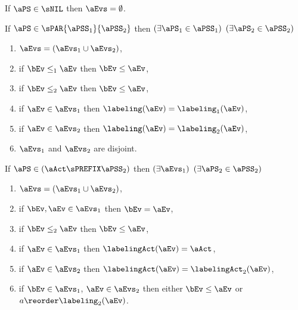 \begin{definition} %
  \label{def:pomset-semantics}

  \noindent
  If $\aPS\in\sNIL$ then $\aEvs = \emptyset$.

  \noindent
  If $\aPS \in \sPAR{\aPSS_1}{\aPSS_2}$ then  
  $(\exists\aPS_1\in\aPSS_1)$ $(\exists\aPS_2\in\aPSS_2)$
  \begin{enumerate}[topsep=0pt]
  \item \label{par-E}
    $\aEvs = (\aEvs_1\cup\aEvs_2)$,
  \item \label{par-le1}
    if $\bEv\le_1\aEv$ then $\bEv\le\aEv$, 
  \item \label{par-le2}
    if $\bEv\le_2\aEv$ then $\bEv\le\aEv$, 
  \item \label{par-lambda1}
    if $\aEv\in\aEvs_1$ then $\labeling(\aEv) = \labeling_1(\aEv)$, 
  \item \label{par-lambda2x}
    if $\aEv\in\aEvs_2$ then $\labeling(\aEv) = \labeling_2(\aEv)$,
    \label{pomsetParCountLast}
    \setcounter{pomsetParCount}{\value{enumi}}
  \item \label{par-disjoint}
    $\aEvs_1$ and $\aEvs_2$ are disjoint.
    \label{pomsetParDisjointCountLast}
    \setcounter{pomsetParDisjointCount}{\value{enumi}}
  \end{enumerate}
  \noindent
  If $\aPS \in (\aAct\sPREFIX\aPSS_2)$ then
  $(\exists\aEvs_1)$ $(\exists\aPS_2\in\aPSS_2)$
  \begin{enumerate}[topsep=0pt]
  \item \label{pre-E}
    $\aEvs=(\aEvs_1 \cup \aEvs_2)$,
  \item \label{pre-unique}
    if $\bEv,\aEv\in\aEvs_1$ then $\bEv=\aEv$,
  \item \label{pre-le2}
    if $\bEv\le_2\aEv$ then $\bEv\le\aEv$, 
  \item \label{pre-lambda1}
    if $\aEv\in\aEvs_1$ then $\labelingAct(\aEv) = \aAct$,
  \item \label{pre-lambda2}
    if $\aEv\in\aEvs_2$ then $\labelingAct(\aEv) = \labelingAct_2(\aEv)$,
  \item
    \label{pre-reorder}
    if $\bEv\in\aEvs_1$, $\aEv\in\aEvs_2$ then either
    $\bEv\leq\aEv$ or $a\reorder\labeling_2(\aEv)$.
    \label{pomsetPrefixOrderCountLast}

\end{enumerate}
\end{definition}
